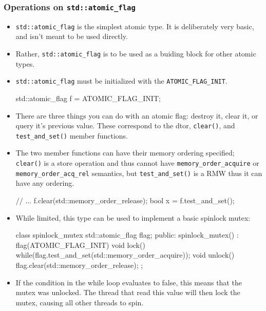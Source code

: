 \documentclass[11pt, a4paper]{article}
\theoremstyle{definition}
\theoremstyle{remark}
\newcommand{\code}[1]{\lstinline|#1|}
\begin{document}
\subsubsection{Operations on \texorpdfstring{\code{std::atomic_flag}}{std::atomic\_flag}} 
\begin{itemize}
    \item \code{std::atomic_flag} is the simplest atomic type. It is deliberately very basic, and isn't meant to be used directly. 
    \item Rather, \code{std::atomic_flag} is to be used as a buiding block for other atomic types. 
    \item \code{std::atomic_flag} must be initialized with the \code{ATOMIC_FLAG_INIT}. 
\begin{cppcode}
std::atomic_flag f = ATOMIC_FLAG_INIT;
\end{cppcode}
    \item There are three things you can do with an atomic flag: destroy it, clear it, or query it's previous value. These correspond to the dtor, \code{clear()}, and \code{test_and_set()} member functions. 
    \item The two member functions can have their memory ordering specified; \code{clear()} is a store operation and thus cannot have \code{memory_order_acquire} or \code{memory_order_acq_rel} semantics, but \code{test_and_set()} is a RMW thus it can have any ordering. 
\begin{cppcode}
// ... 
f.clear(std::memory_order_release);
bool x = f.test_and_set();
\end{cppcode}
    \item While limited, this type can be used to implement a basic spinlock mutex: 
\begin{cppcode}
class spinlock_mutex {
    std::atomic_flag flag;
public:
    spinlock_mutex() : flag(ATOMIC_FLAG_INIT) {}
    void lock() {
        while(flag.test_and_set(std::memory_order_acquire));
    }
    void unlock() {
        flag.clear(std::memory_order_release);
    }
};
\end{cppcode}
    \item If the condition in the while loop evaluates to false, this means that the mutex was unlocked. The thread that read this value will then lock the mutex, causing all other threads to spin.
\end{itemize}
\end{document}
